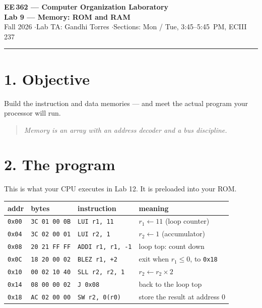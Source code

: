 \documentclass[11pt]{article}
\newcommand{\code}[1]{\texttt{#1}}
\newcommand{\hr}{\vspace{2pt}\hrule\vspace{6pt}}
\begin{document}
\begin{center}
{\Large\bfseries EE\,362 --- Computer Organization Laboratory}\\[2pt]
{\large\bfseries Lab 9 --- Memory: ROM and RAM}\\[4pt]
Fall 2026 \quad$\cdot$\quad Lab TA: Gandhi Torres \quad$\cdot$\quad Sections: Mon / Tue, 3:45--5:45~PM, ECIII 237
\end{center}
\hr

\section*{1. Objective}

Build the instruction and data memories --- and meet the actual program your
processor will run.

\begin{quote}
\emph{Memory is an array with an address decoder and a bus discipline.}
\end{quote}

\section*{2. The program}

This is what your CPU executes in Lab 12. It is preloaded into your ROM.

\begin{center}
\begin{tabular}{llll}
\toprule
addr & bytes & instruction & meaning \\
\midrule
\code{0x00} & \code{3C 01 00 0B} & \code{LUI  r1, 11} & $r_1 \leftarrow 11$ (loop counter) \\
\code{0x04} & \code{3C 02 00 01} & \code{LUI  r2, 1} & $r_2 \leftarrow 1$ (accumulator) \\
\code{0x08} & \code{20 21 FF FF} & \code{ADDI r1, r1, -1} & loop top: count down \\
\code{0x0C} & \code{18 20 00 02} & \code{BLEZ r1, +2} & exit when $r_1 \leq 0$, to \code{0x18} \\
\code{0x10} & \code{00 02 10 40} & \code{SLL  r2, r2, 1} & $r_2 \leftarrow r_2 \times 2$ \\
\code{0x14} & \code{08 00 00 02} & \code{J    0x08} & back to the loop top \\
\code{0x18} & \code{AC 02 00 00} & \code{SW   r2, 0(r0)} & store the result at address 0 \\
\bottomrule
\end{tabular}
\end{center}
\end{document}
